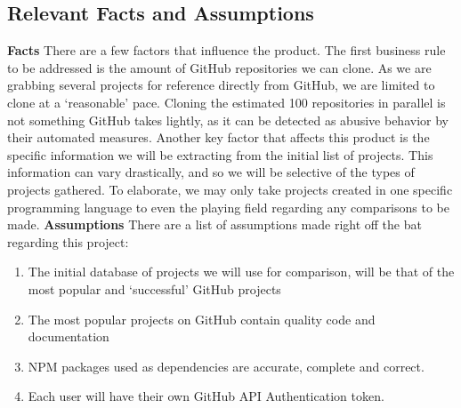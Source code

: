\documentclass{article}
\begin{document}
\subsection{Relevant Facts and Assumptions}
\textbf{Facts}
\newline
There are a few factors that influence the product. The first business rule to be addressed is the amount of GitHub repositories we can clone. As we are grabbing several projects for reference directly from GitHub, we are limited to clone at a ‘reasonable’ pace. Cloning the estimated 100 repositories in parallel is not something GitHub takes lightly, as it can be detected as abusive behavior by their automated measures. Another key factor that affects this product is the specific information we will be extracting from the initial list of projects. This information can vary drastically, and so we will be selective of the types of projects gathered. To elaborate, we may only take projects created in one specific programming language to even the playing field regarding any comparisons to be made.
\newline
\newline 
\textbf{Assumptions}
\newline
\newline 
There are a list of assumptions made right off the bat regarding this project:
\begin{enumerate}
\item The initial database of projects we will use for comparison, will be that of the most popular and ‘successful’ GitHub projects
\item The most popular projects on GitHub contain quality code and documentation
\item NPM packages used as dependencies are accurate, complete and correct. 
\item Each user will have their own GitHub API Authentication token. 

\end{enumerate}

\end{document}
